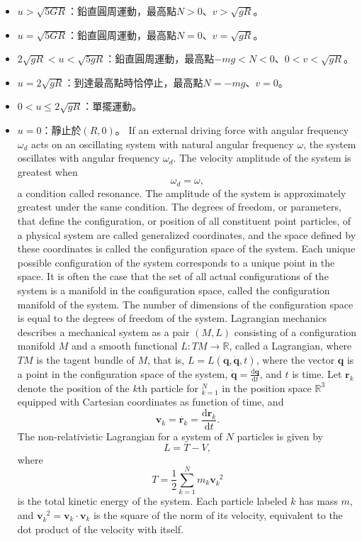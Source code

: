 \documentclass[a4paper,12pt]{article}
\begin{document}
\begin{itemize}
\item $u>\sqrt{5GR}$：鉛直圓周運動，最高點$N>0$、$v>\sqrt{gR}$。
\item $u=\sqrt{5GR}$：鉛直圓周運動，最高點$N=0$、$v=\sqrt{gR}$。
\item $2\sqrt{gR}<u<\sqrt{5gR}$：鉛直圓周運動，最高點$-mg<N<0$、$0<v<\sqrt{gR}$。
\item $u=2\sqrt{gR}$：到達最高點時恰停止，最高點$N=-mg$、$v=0$。
\item $0<u\leq2\sqrt{gR}$：單擺運動。
\item $u=0$：靜止於$(R,0)$。
\eit
{}
If an external driving force with angular frequency $\omega_d$ acts on an oscillating system with natural angular frequency $\omega$, the system oscillates with angular frequency $\omega_d$. The velocity amplitude of the system is greatest when
\[\omega_d=\omega,\]
a condition called resonance. The amplitude of the system is approximately greatest under the same condition.
The degrees of freedom, or parameters, that define the configuration, or position of all constituent point particles, of a physical system are called generalized coordinates, and the space defined by these coordinates is called the configuration space of the system. Each unique possible configuration of the system corresponds to a unique point in the space. It is often the case that the set of all actual configurations of the system is a manifold in the configuration space, called the configuration manifold of the system. The number of dimensions of the configuration space is equal to the degrees of freedom of the system.
Lagrangian mechanics describes a mechanical system as a pair $(M,L)$ consisting of a configuration manifold $M$ and a smooth functional $L\colon TM\to\mathbb{R}$, called a Lagrangian, where $TM$ is the tagent bundle of $M$, that is, $L=L(\mathbf{q},\dot{\mathbf{q}},t)$, where the vector $\mathbf{q}$ is a point in the configuration space of the system, $\dot{\mathbf{q}}=\frac{\mathrm{d}\mathbf{q}}{\mathrm{d}t}$, and $t$ is time.
Let $\mathbf{r}_k$ denote the position of the $k$th particle for $_{k=1}^N$ in the position space $\mathbb{R}^3$ equipped with Cartesian coordinates as function of time, and \[\mathbf{v}_k=\dot{\mathbf{r}_k}=\frac{\mathrm{d}\mathbf{r}_k}{\mathrm{d}t}.\]
The non-relativistic Lagrangian for a system of $N$ particles is given by
\[L=T-V,\]
where
\[T=\frac{1}{2}\sum_{k=1}^Nm_k\mathbf{v}_k^{\phantom{k}2}\]
is the total kinetic energy of the system. Each particle labeled $k$ has mass $m$, and $\mathbf{v}_k^{\phantom{k}2}=\mathbf{v}_k\cdot\mathbf{v}_k$ is the square of the norm of its velocity, equivalent to the dot product of the velocity with itself.


\end{itemize}
\end{document}
